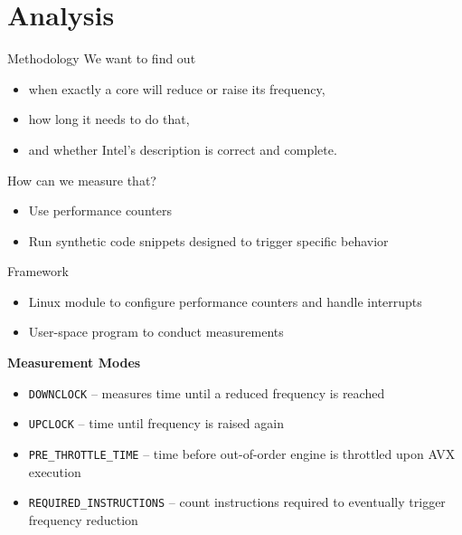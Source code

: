\section{Analysis}

\begin{frame}[t]{Methodology}
	We want to find out
	\begin{itemize}
		\item when exactly a core will reduce or raise its frequency,
		\item how long it needs to do that,
		\item and whether Intel's description is correct and complete.
	\end{itemize}
	\pause
	How can we measure that?
	\begin{itemize}
		\item Use performance counters
		\item Run synthetic code snippets designed to trigger specific behavior
	\end{itemize}
\end{frame}

\begin{frame}[t]{Framework}
	\begin{itemize}
		\item Linux module to configure performance counters and handle interrupts
		\item User-space program to conduct measurements
	\end{itemize}
	\pause
	\textbf{Measurement Modes}
	\begin{itemize}
		\item \texttt{DOWNCLOCK} -- measures time until a reduced frequency is reached
		\item \texttt{UPCLOCK} -- time until frequency is raised again
		\item \texttt{PRE\_THROTTLE\_TIME} -- time before out-of-order engine is throttled upon AVX execution
		\item \texttt{REQUIRED\_INSTRUCTIONS} -- count instructions required to eventually trigger frequency reduction
	\end{itemize}
\end{frame}


